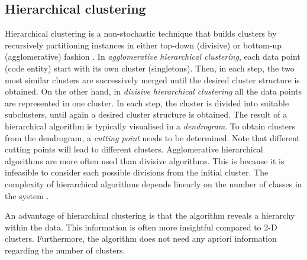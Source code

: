 \subsection{Hierarchical clustering}
Hierarchical clustering is a non-stochastic technique that builds clusters by recursively partitioning instances in either top-down (divisive) or bottom-up (agglomerative) fashion \cite{rokach2005clustering}. In \textit{agglomerative hierarchical clustering}, each data point (code entity) start with its own cluster (singletons). Then, in each step, the two most similar clusters are successively merged until the desired cluster structure is obtained. On the other hand, in \textit{divisive hierarchical clustering} all the data points are represented in one cluster. In each step, the cluster is divided into suitable subclusters, until again a desired cluster structure is obtained. The result of a hierarchical algorithm is typically visualised in a \textit{dendrogram}. To obtain clusters from the dendrogram, a \textit{cutting point} needs to be determined. Note that different cutting points will lead to different clusters. Agglomerative hierarchical algorithms are more often used than divisive algorithms. This is because it is infeasible to consider each possible divisions from the initial cluster. The complexity of hierarchical algorithms depends linearly on the number of classes in the system \cite{kebir2012comparing}.\par 
An advantage of hierarchical clustering is that the algorithm reveals a hierarchy within the data. This information is often more insightful compared to 2-D clusters. Furthermore, the algorithm does not need any apriori information regarding the number of clusters. 

